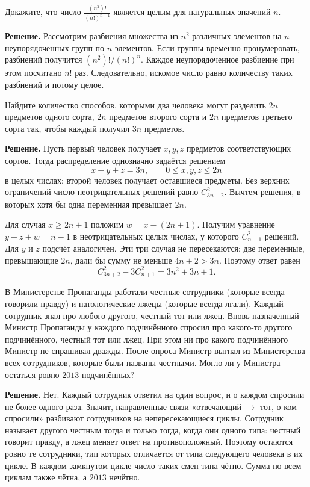 \begin{problems}
\item Докажите, что число $\displaystyle\frac{(n^2)!}{(n!)^{n+1}}$ является целым для натуральных значений $n$.
\par\smallskip\noindent\textbf{Решение.} Рассмотрим разбиения множества из $n^2$ различных элементов на $n$ неупорядоченных групп по $n$ элементов. Если группы временно пронумеровать, разбиений получится $(n^2)!/(n!)^n$. Каждое неупорядоченное разбиение при этом посчитано $n!$ раз. Следовательно, искомое число равно количеству таких разбиений и потому целое.\par

\item Найдите количество способов, которыми два человека могут разделить $2n$ предметов одного сорта, $2n$ предметов второго сорта и $2n$ предметов третьего сорта так, чтобы каждый получил $3n$ предметов.
\par\smallskip\noindent\textbf{Решение.} Пусть первый человек получает $x,y,z$ предметов соответствующих сортов. Тогда распределение однозначно задаётся решением
\[
x+y+z=3n,\qquad 0\le x,y,z\le2n
\]
в целых числах; второй человек получает оставшиеся предметы. Без верхних ограничений число неотрицательных решений равно $C_{3n+2}^{2}$. Вычтем решения, в которых хотя бы одна переменная превышает $2n$.
\par Для случая $x\ge2n+1$ положим $w=x-(2n+1)$. Получим уравнение $y+z+w=n-1$ в неотрицательных целых числах, у которого $C_{n+1}^{2}$ решений. Для $y$ и $z$ подсчёт аналогичен. Эти три случая не пересекаются: две переменные, превышающие $2n$, дали бы сумму не меньше $4n+2>3n$. Поэтому ответ равен
\[
C_{3n+2}^{2}-3C_{n+1}^{2}=3n^2+3n+1.
\]\par

\item В Министерстве Пропаганды работали честные сотрудники (которые всегда говорили правду) и патологические лжецы (которые всегда лгали). Каждый сотрудник знал про любого другого, честный тот или лжец. Вновь назначенный Министр Пропаганды у каждого подчинённого спросил про какого-то другого подчинённого, честный тот или лжец. При этом ни про какого подчинённого Министр не спрашивал дважды. После опроса Министр выгнал из Министерства всех сотрудников, которые были названы честными. Могло ли у Министра остаться ровно $2013$ подчинённых?
\par\smallskip\noindent\textbf{Решение.} Нет. Каждый сотрудник ответил на один вопрос, и о каждом спросили не более одного раза. Значит, направленные связи «отвечающий $\to$ тот, о ком спросили» разбивают сотрудников на непересекающиеся циклы. Сотрудник называет другого честным тогда и только тогда, когда они одного типа: честный говорит правду, а лжец меняет ответ на противоположный. Поэтому остаются ровно те сотрудники, тип которых отличается от типа следующего человека в их цикле. В каждом замкнутом цикле число таких смен типа чётно. Сумма по всем циклам также чётна, а $2013$ нечётно.\par


\end{problems}
